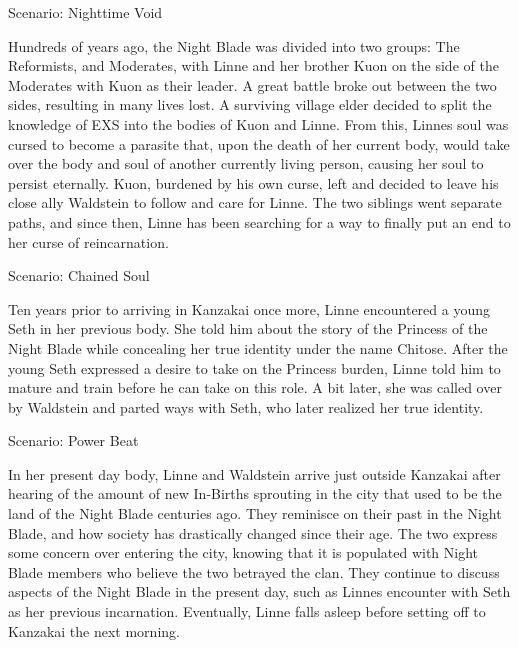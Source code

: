 \begin{tcolorbox}[breakable, colback=white, colframe=black!80,
  boxrule=0.6pt, arc=0mm, left=3mm, right=3mm, top=2mm, bottom=2mm]
\ttfamily\small\raggedright
Scenario: Nighttime Void\par
Hundreds of years ago, the Night Blade was divided into two groups: The Reformists, and Moderates, with Linne and her brother Kuon on the side of the Moderates with Kuon as their leader. A great battle broke out between the two sides, resulting in many lives lost. A surviving village elder decided to split the knowledge of EXS into the bodies of Kuon and Linne. From this, Linne\textquotesingle{}s soul was cursed to become a parasite that, upon the death of her current body, would take over the body and soul of another currently living person, causing her soul to persist eternally. Kuon, burdened by his own curse, left and decided to leave his close ally Waldstein to follow and care for Linne. The two siblings went separate paths, and since then, Linne has been searching for a way to finally put an end to her curse of reincarnation.\par
\medskip
Scenario: Chained Soul\par
Ten years prior to arriving in Kanzakai once more, Linne encountered a young Seth in her previous body. She told him about the story of the Princess of the Night Blade while concealing her true identity under the name Chitose. After the young Seth expressed a desire to take on the Princess\textquotesingle{} burden, Linne told him to mature and train before he can take on this role. A bit later, she was called over by Waldstein and parted ways with Seth, who later realized her true identity.\par
\medskip
Scenario: Power Beat\par
In her present day body, Linne and Waldstein arrive just outside Kanzakai after hearing of the amount of new In-{}Births sprouting in the city that used to be the land of the Night Blade centuries ago. They reminisce on their past in the Night Blade, and how society has drastically changed since their age. The two express some concern over entering the city, knowing that it is populated with Night Blade members who believe the two betrayed the clan. They continue to discuss aspects of the Night Blade in the present day, such as Linne\textquotesingle{}s encounter with Seth as her previous incarnation. Eventually, Linne falls asleep before setting off to Kanzakai the next morning.\par
\medskip

\end{tcolorbox}
